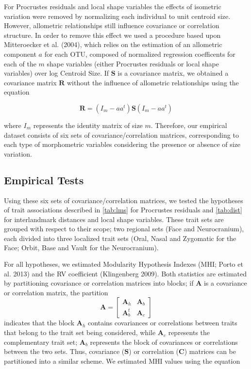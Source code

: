 \documentclass[12pt,]{article}
\begin{document}
For Procrustes residuals and local shape variables the effects of
isometric variation were removed by normalizing each individual to unit
centroid size. However, allometric relationships still influence
covariance or correlation structure. In order to remove this effect we
used a procedure based upon Mitteroecker et al. (2004), which relies on
the estimation of an allometric component $a$ for each OTU, composed of
normalized regression coefficents for each of the $m$ shape variables
(either Procrustes residuals or local shape variables) over log Centroid
Size. If $\mathbf{S}$ is a covariance matrix, we obtained a covariance
matrix $\mathbf{R}$ without the influence of allometric relationships
using the equation

\begin{equation}
\mathbf{R} = (I_m - aa^t) \mathbf{S} (I_m - aa^t)
\label{eq:allo}
\end{equation}

where $I_m$ represents the identity matrix of size $m$. Therefore, our
empirical dataset consists of six sets of covariance/correlation
matrices, corresponding to each type of morphometric variables
considering the presence or absence of size variation.

\subsection{Empirical Tests}\label{empirical-tests}

Using these six sets of covariance/correlation matrices, we tested the
hypotheses of trait associations described in \autoref{tab:lms} for
Procrustes residuals and \autoref{tab:dist} for interlandmark distances
and local shape variables. These trait sets are grouped with respect to
their scope; two regional sets (Face and Neurocranium), each divided
into three localized trait sets (Oral, Nasal and Zygomatic for the Face;
Orbit, Base and Vault for the Neurocranium).

For all hypotheses, we estimated Modularity Hypothesis Indexes (MHI;
Porto et al. 2013) and the RV coefficient (Klingenberg 2009). Both
statistics are estimated by partitioning covariance or correlation
matrices into blocks; if $\mathbf{A}$ is a covariance or correlation
matrix, the partition \[
\mathbf{A} =
\begin{bmatrix}
\mathbf{A}_h & \mathbf{A}_b \\
\mathbf{A}^t_b & \mathbf{A}_c
\end{bmatrix}
\] indicates that the block $\mathbf{A}_h$ contains covariances or
correlations between traits that belong to the trait set being
considered, while $\mathbf{A}_c$ represents the complementary trait set;
$\mathbf{A}_b$ represents the block of covariances or correlations
between the two sets. Thus, covariance ($\mathbf{S}$) or correlation
($\mathbf{C}$) matrices can be partitioned into a similar scheme. We
estimated MHI values using the equation
\end{document}
